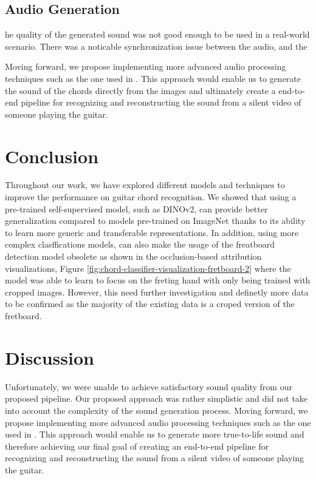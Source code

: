 \documentclass[10pt,twocolumn,letterpaper]{article}
\begin{document}
\subsection{Audio Generation}



he quality of the generated sound was not good enough to be used in a real-world scenario. There was a noticable synchronization issue between the audio, and the

Moving forward, we propose implementing more advanced audio processing techniques such as the one used in \cite{su2020audeo}. This approach would enable us to generate the sound of the chords directly from the images and ultimately create a end-to-end pipeline for recognizing and reconstructing the sound from a silent video of someone playing the guitar.

\section{Conclusion}
Throughout our work, we have explored different models and techniques to improve the performance on guitar chord recognition.  We showed that using a pre-trained self-supervised model, such as DINOv2, can provide better generalization compared to models pre-trained on ImageNet thanks to its ability to learn more generic and transferable representations. In addition, using more complex clasffications models, can also make the usage of the freatboard detection model obsolete as shown in the occlusion-based attribution visualizations, Figure \ref{fig:chord-classifier-visualization-fretboard-2} where the model was able to learn to focus on the freting hand with only being trained with cropped images. However, this need further investigation and definetly more data to be confirmed as the majority of the existing data is a croped version of the fretboard.

\section{Discussion}
Unfortunately, we were unable to achieve satisfactory sound quality from our proposed pipeline. Our proposed approach was rather simplistic and did not take into account the complexity of the sound generation process. Moving forward, we propose implementing more advanced audio processing techniques such as the one used in \cite{su2020audeo}. This approach would enable us to generate more true-to-life sound and therefore achieving our final goal of creating an end-to-end pipeline for recognizing and reconstructing the sound from a silent video of someone playing the guitar.

    {\small
        
        
    }
\end{document}
